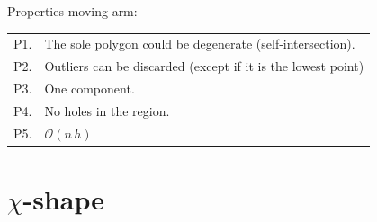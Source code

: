 Properties moving arm:
\\
\begin{tabular}{@{}ll@{}}
\toprule
  P1. & The sole polygon could be degenerate (self-intersection).  \\  
  P2. & Outliers can be discarded (except if it is the lowest point) \\
  P3. & One component.  \\ 
  P4. & No holes in the region.  \\  
  P5. & $\mathcal{O}(n \, h)$  \\  
\bottomrule
\end{tabular}



%
\section{$\chi$-shape}

